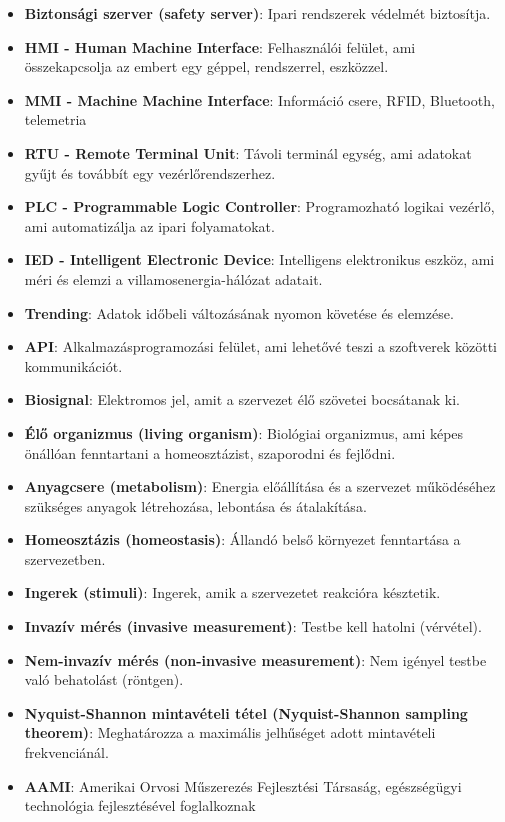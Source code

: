 \begin{itemize}
    \item \textbf{Biztonsági szerver (safety server)}: Ipari rendszerek védelmét biztosítja.
    \item \textbf{HMI - Human Machine Interface}: Felhasználói felület, ami összekapcsolja az embert egy géppel, rendszerrel, eszközzel.
    \item \textbf{MMI - Machine Machine Interface}: Információ csere, RFID, Bluetooth, telemetria
    \item \textbf{RTU - Remote Terminal Unit}: Távoli terminál egység, ami adatokat gyűjt és továbbít egy vezérlőrendszerhez.
    \item \textbf{PLC - Programmable Logic Controller}: Programozható logikai vezérlő, ami automatizálja az ipari folyamatokat.
    \item \textbf{IED - Intelligent Electronic Device}: Intelligens elektronikus eszköz, ami méri és elemzi a villamosenergia-hálózat adatait.
    \item \textbf{Trending}: Adatok időbeli változásának nyomon követése és elemzése.
    \item \textbf{API}: Alkalmazásprogramozási felület, ami lehetővé teszi a szoftverek közötti kommunikációt.
    \item \textbf{Biosignal}: Elektromos jel, amit a szervezet élő szövetei bocsátanak ki.
    \item \textbf{Élő organizmus (living organism)}: Biológiai organizmus, ami képes önállóan fenntartani a homeosztázist, szaporodni és fejlődni.
    \item \textbf{Anyagcsere (metabolism)}: Energia előállítása és a szervezet működéséhez szükséges anyagok létrehozása, lebontása és átalakítása.
    \item \textbf{Homeosztázis (homeostasis)}: Állandó belső környezet fenntartása a szervezetben.
    \item \textbf{Ingerek (stimuli)}: Ingerek, amik a szervezetet reakcióra késztetik.
    \item \textbf{Invazív mérés (invasive measurement)}: Testbe kell hatolni (vérvétel).
    \item \textbf{Nem-invazív mérés (non-invasive measurement)}: Nem igényel testbe való behatolást (röntgen).
    \item \textbf{Nyquist-Shannon mintavételi tétel (Nyquist-Shannon sampling theorem)}: Meghatározza a maximális jelhűséget adott mintavételi frekvenciánál.
    \item \textbf{AAMI}: Amerikai Orvosi Műszerezés Fejlesztési Társaság, egészségügyi technológia fejlesztésével foglalkoznak

\end{itemize}
